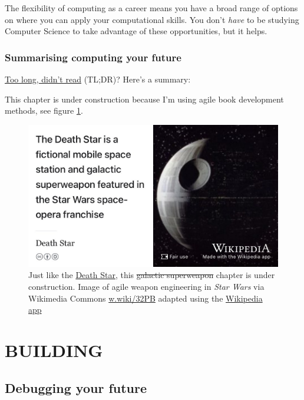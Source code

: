 \documentclass[
]{book}
\begin{document}
The flexibility of computing as a career means you have a broad range of options on where you can apply your computational skills. You don't \emph{have} to be studying Computer Science to take advantage of these opportunities, but it helps.

\hypertarget{tldr6}{%
\section{Summarising computing your future}\label{tldr6}}

\href{https://en.wiktionary.org/wiki/too_long;_didn\%27t_read}{Too long, didn't read} (TL;DR)? Here's a summary:

This chapter is under construction because I'm using agile book development methods, see figure \ref{fig:deathstar3-fig}.

\begin{figure}

{\centering \includegraphics[width=0.99\linewidth]{images/DeathStar2} 

}

\caption{Just like the \href{https://en.wikipedia.org/wiki/Death_Star}{Death Star}, this \sout{galactic superweapon} chapter is under construction. Image of agile weapon engineering in \emph{Star Wars} via Wikimedia Commons \href{https://w.wiki/32PB}{w.wiki/32PB} adapted using the \href{https://apps.apple.com/gb/app/wikipedia/id324715238}{Wikipedia app}}\label{fig:deathstar3-fig}
\end{figure}

\hypertarget{part-building}{%
\part{BUILDING}\label{part-building}}

\hypertarget{debugging}{%
\chapter{Debugging your future}\label{debugging}}
\end{document}

